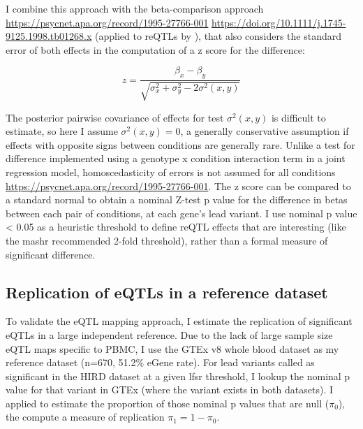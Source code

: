 I combine this approach with the beta-comparison approach \url{https://psycnet.apa.org/record/1995-27766-001} \url{https://doi.org/10.1111/j.1745-9125.1998.tb01268.x} \autocite{schenker2001JudgingSignificanceDifferences} (applied to reQTLs by \autocite{kim-hellmuth2017GeneticRegulatoryEffects}), that also considers the standard error of both effects in the computation of a z score for the difference:

\begin{equation}
z = \frac{\beta_x - \beta_y}{\sqrt{\sigma_x^2 + \sigma_y^2 - 2\sigma^2(x, y)}}
\end{equation}

The posterior pairwise covariance of effects for test $\sigma^2(x, y)$ is difficult to estimate, so here I assume $\sigma^2(x, y) = 0$, a generally conservative assumption if effects with opposite signs between conditions are generally rare.
Unlike a test for difference implemented using a genotype x condition interaction term in a joint regression model, homoscedasticity of errors is not assumed for all conditions \url{https://psycnet.apa.org/record/1995-27766-001}.
The z score can be compared to a standard normal to obtain a nominal Z-test p value for the difference in betas between each pair of conditions, at each gene's lead variant.
I use nominal p value < 0.05 as a heuristic threshold to define reQTL effects that are interesting (like the mashr recommended 2-fold threshold), rather than a formal measure of significant difference.

\subsection{Replication of eQTLs in a reference dataset}

To validate the \gls{eQTL} mapping approach, I estimate the replication of significant eQTLs in a large independent reference.
Due to the lack of large sample size \gls{eQTL} maps specific to \gls{PBMC}, I use the GTEx v8 whole blood dataset as my reference dataset (n=670, 51.2\% eGene rate).
For lead variants called as significant in the \gls{HIRD} dataset at a given lfsr threshold, I lookup the nominal p value for that variant in GTEx (where the variant exists in both datasets).
I applied  to estimate the proportion of those nominal p values that are null ($\pi_0$), the compute a measure of replication $\pi_1 = 1 - \pi_0$.

